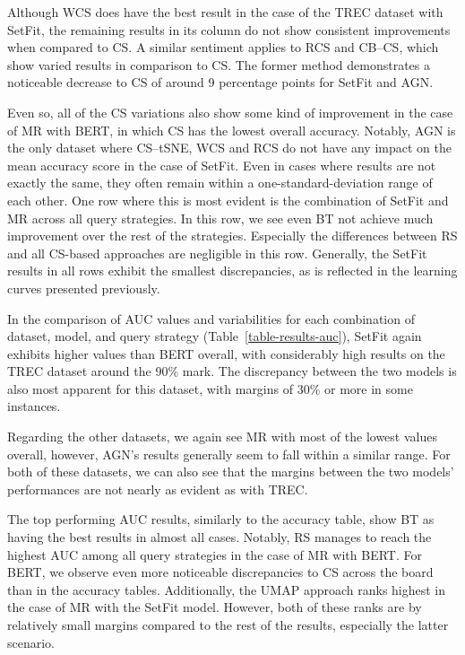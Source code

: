 \documentclass[english,bachelor,ul]{webisthesis} %
\begin{document}
Although WCS does have the best result in the case of the TREC dataset with SetFit, the remaining results in its column do not show consistent improvements when compared to CS. A similar sentiment applies to RCS and CB--CS, which show varied results in comparison to CS. The former method demonstrates a noticeable decrease to CS of around 9 percentage points for SetFit and AGN.

Even so, all of the CS variations also show some kind of improvement in the case of MR with BERT, in which CS has the lowest overall accuracy. Notably, AGN is the only dataset where CS--tSNE, WCS and RCS do not have any impact on the mean accuracy score in the case of SetFit. Even in cases where results are not exactly the same, they often remain within a one-standard-deviation range of each other. One row where this is most evident is the combination of SetFit and MR across all query strategies. In this row, we see even BT not achieve much improvement over the rest of the strategies. Especially the differences between RS and all CS-based approaches are negligible in this row. Generally, the SetFit results in all rows exhibit the smallest discrepancies, as is reflected in the learning curves presented previously.

In the comparison of AUC values and variabilities for each combination of dataset, model, and query strategy (Table~\ref{table-results-auc}), SetFit again exhibits higher values than BERT overall, with considerably high results on the TREC dataset around the 90\% mark. The discrepancy between the two models is also most apparent for this dataset, with margins of 30\% or more in some instances. 

Regarding the other datasets, we again see MR with most of the lowest values overall, however, AGN's results generally seem to fall within a similar range. For both of these datasets, we can also see that the margins between the two models' performances are not nearly as evident as with TREC.

The top performing AUC results, similarly to the accuracy table, show BT as having the best results in almost all cases. Notably, RS manages to reach the highest AUC among all query strategies in the case of MR with BERT. For BERT, we observe even more noticeable discrepancies to CS across the board than in the accuracy tables. Additionally, the UMAP approach ranks highest in the case of MR with the SetFit model. However, both of these ranks are by relatively small margins compared to the rest of the results, especially the latter scenario. 
\end{document}
